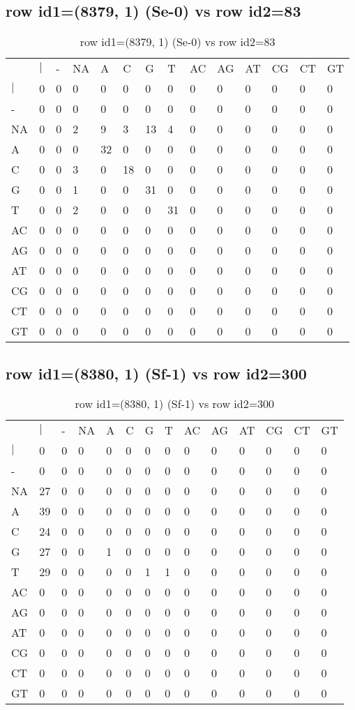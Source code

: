 \subsection{row id1=(8379, 1) (Se-0) vs row id2=83}
\begin{center}
\begin{longtable}{|l|l|l|l|l|l|l|l|l|l|l|l|l|l|}
\caption{row id1=(8379, 1) (Se-0) vs row id2=83} \label{table_dm426}\\
\hline
\\
\hline
&$|$&-&NA&A&C&G&T&AC&AG&AT&CG&CT&GT\\
$|$&0&0&0&0&0&0&0&0&0&0&0&0&0\\
-&0&0&0&0&0&0&0&0&0&0&0&0&0\\
NA&0&0&2&9&3&13&4&0&0&0&0&0&0\\
A&0&0&0&32&0&0&0&0&0&0&0&0&0\\
C&0&0&3&0&18&0&0&0&0&0&0&0&0\\
G&0&0&1&0&0&31&0&0&0&0&0&0&0\\
T&0&0&2&0&0&0&31&0&0&0&0&0&0\\
AC&0&0&0&0&0&0&0&0&0&0&0&0&0\\
AG&0&0&0&0&0&0&0&0&0&0&0&0&0\\
AT&0&0&0&0&0&0&0&0&0&0&0&0&0\\
CG&0&0&0&0&0&0&0&0&0&0&0&0&0\\
CT&0&0&0&0&0&0&0&0&0&0&0&0&0\\
GT&0&0&0&0&0&0&0&0&0&0&0&0&0\\
\hline
\end{longtable}
\end{center}

\subsection{row id1=(8380, 1) (Sf-1) vs row id2=300}
\begin{center}
\begin{longtable}{|l|l|l|l|l|l|l|l|l|l|l|l|l|l|}
\caption{row id1=(8380, 1) (Sf-1) vs row id2=300} \label{table_dm428}\\
\hline
\\
\hline
&$|$&-&NA&A&C&G&T&AC&AG&AT&CG&CT&GT\\
$|$&0&0&0&0&0&0&0&0&0&0&0&0&0\\
-&0&0&0&0&0&0&0&0&0&0&0&0&0\\
NA&27&0&0&0&0&0&0&0&0&0&0&0&0\\
A&39&0&0&0&0&0&0&0&0&0&0&0&0\\
C&24&0&0&0&0&0&0&0&0&0&0&0&0\\
G&27&0&0&1&0&0&0&0&0&0&0&0&0\\
T&29&0&0&0&0&1&1&0&0&0&0&0&0\\
AC&0&0&0&0&0&0&0&0&0&0&0&0&0\\
AG&0&0&0&0&0&0&0&0&0&0&0&0&0\\
AT&0&0&0&0&0&0&0&0&0&0&0&0&0\\
CG&0&0&0&0&0&0&0&0&0&0&0&0&0\\
CT&0&0&0&0&0&0&0&0&0&0&0&0&0\\
GT&0&0&0&0&0&0&0&0&0&0&0&0&0\\
\hline
\end{longtable}
\end{center}

